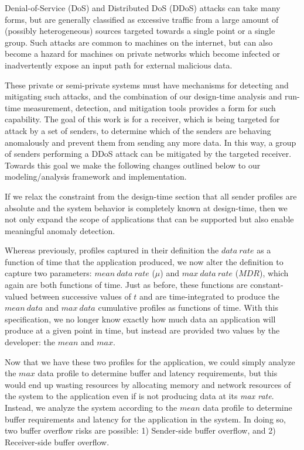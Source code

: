 Denial-of-Service (DoS)\cite{rfc4732} and Distributed DoS (DDoS) attacks
can take many forms, but are generally classified as excessive traffic
from a large amount of (possibly heterogeneous) sources targeted
towards a single point or a single group.  Such attacks are common to
machines on the internet, but can also become a hazard for machines on
private networks which become infected or inadvertently expose an
input path for external malicious data.

These private or semi-private systems must have mechanisms for
detecting and mitigating such attacks, and the combination of our
design-time analysis and run-time measurement, detection, and
mitigation tools provides a form for such capability.  The goal of
this work is for a receiver, which is being targeted for attack by a
set of senders, to determine which of the senders are behaving
anomalously and prevent them from sending any more data.  In this way,
a group of senders performing a DDoS attack can be mitigated by the
targeted receiver.  Towards this goal we make the following changes
outlined below to our modeling/analysis framework and implementation.

If we relax the constraint from the design-time section that all
sender profiles are absolute and the system behavior is completely
known at design-time, then we not only expand the scope of
applications that can be supported but also enable meaningful anomaly
detection.

Whereas previously, profiles captured in their definition the
$data\ rate$ as a function of time that the application
produced, we now alter the definition to capture two parameters:
$mean\ data\ rate$ ($\mu$) and $max\ data\ rate$
($MDR$), which again are both functions of time.  Just as
before, these functions are constant-valued between successive values
of $t$ and are time-integrated to produce the $mean\ data$
and $max\ data$ cumulative profiles as functions of time.  With
this specification, we no longer know exactly how much data an
application will produce at a given point in time, but instead are
provided two values by the developer: the $mean$ and
$max$.

Now that we have these two profiles for the application, we could
simply analyze the $max$ data profile to determine buffer and latency
requirements, but this would end up wasting resources by allocating
memory and network resources of the system to the application even if
is not producing data at its \emph{max rate}.  Instead, we analyze the
system according to the $mean$ data profile to determine buffer
requirements and latency for the application in the system.  In doing
so, two buffer overflow risks are possible: 1) Sender-side buffer
overflow, and 2) Receiver-side buffer overflow.

